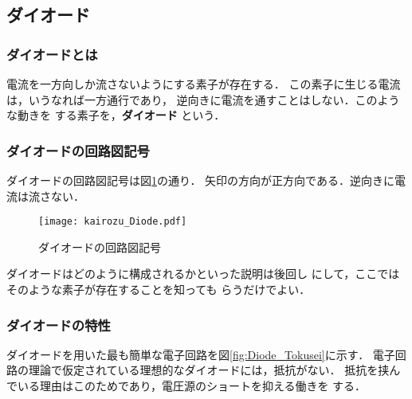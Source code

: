     \subsection{ダイオード}
        \subsubsection{ダイオードとは}
        電流を一方向しか流さないようにする素子が存在する．
        この素子に生じる電流は，いうなれば一方通行であり，
        逆向きに電流を通すことはしない．このような動きを
        する素子を，\textbf{ダイオード} という．

        \subsubsection{ダイオードの回路図記号}
            ダイオードの回路図記号は図\ref{fig:kairozu_Diode}の通り．
            矢印の方向が正方向である．逆向きに電流は流さない．
            \begin{figure}[hbt]
                \begin{center}
                    \texttt{[image: kairozu\_Diode.pdf]}
                    \caption{ダイオードの回路図記号}
                    \label{fig:kairozu_Diode}
                \end{center}
            \end{figure}

        ダイオードはどのように構成されるかといった説明は後回し
        にして，ここではそのような素子が存在することを知っても
        らうだけでよい．

        \subsubsection{ダイオードの特性}
        ダイオードを用いた最も簡単な電子回路を図\ref{fig:Diode_Tokusei}に示す．
        電子回路の理論で仮定されている理想的なダイオードには，抵抗がない．
        抵抗を挟んでいる理由はこのためであり，電圧源のショートを抑える働きを
        する．

